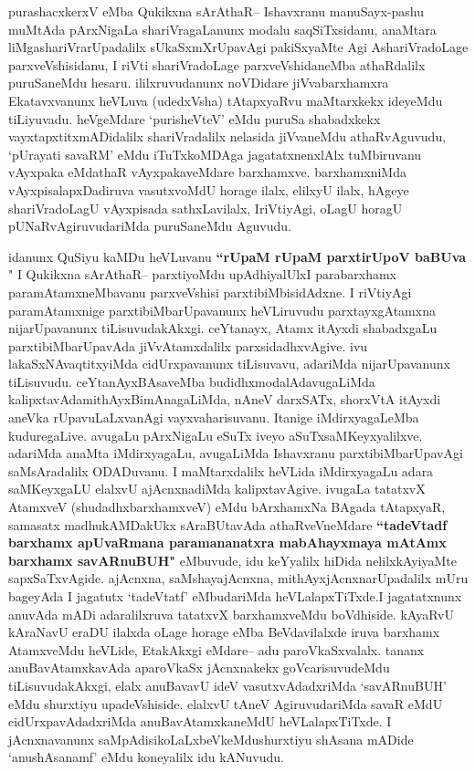 \begin{artha}
purashacxkerxV eMba Qukikxna sArAthaR-- Ishavxranu manuSayx-pashu muMtAda pArxNigaLa shariVragaLanunx modalu saqSiTxsidanu, anaMtara liMgashariVrarUpadalilx sUkaSxmXrUpavAgi pakiSxyaMte Agi AshariVradoLage parxveVshisidanu, I riVti shariVradoLage parxveVshidaneMba athaRdalilx puruSaneMdu hesaru. ililxruvudanunx noVDidare jiVvabarxhamxra Ekatavxvanunx heVLuva (udedxVsha) tAtapxyaRvu maMtarxkekx ideyeMdu tiLiyuvadu. heVgeMdare `purisheVteV' eMdu puruSa shabadxkekx vayxtapxtitxmADidalilx shariVradalilx nelasida jiVvaneMdu athaRvAguvudu, `pUrayati savaRM' eMdu iTuTxkoMDAga jagatatxnenxlAlx tuMbiruvanu vAyxpaka eMdathaR vAyxpakaveMdare barxhamxve. barxhamxniMda vAyxpisalapxDadiruva vasutxvoMdU horage ilalx, elilxyU ilalx, hAgeye shariVradoLagU vAyxpisada sathxLavilalx, IriVtiyAgi, oLagU horagU pUNaRvAgiruvudariMda puruSaneMdu Aguvudu.  

idanunx QuSiyu kaMDu heVLuvanu \ndash \textbf{``rUpaM rUpaM parxtirUpoV baBUva}  \mdash  \mdash  " I Qukikxna sArAthaR-- parxtiyoMdu upAdhiyalUlx\break I parabarxhamx paramAtamxneMbavanu parxveVshisi parxtibiMbisidAdxne. I riVtiyAgi paramAtamxnige parxtibiMbarUpavanunx heVLiruvudu parxtayxgAtamxna nijarUpavanunx tiLisuvudakAkxgi.  ceYtanayx, Atamx itAyxdi shabadxgaLu parxtibiMbarUpavAda jiVvAtamxdalilx parxsidadhxvAgive. ivu lakaSxNAvaqtitxyiMda cidUrxpavanunx tiLisuvavu, adariMda nijarUpavanunx tiLisuvudu. ceYtanAyxBAsaveMba budidhxmodalAdavugaLiMda kalipxtavAda\break mithAyxBimAnagaLiMda, nAneV darxSATx, shorxVtA itAyxdi aneVka rUpavuLaLxvanAgi vayxvaharisuvanu. Itanige iMdirxyagaLeMba kuduregaLive. avugaLu pArxNigaLu eSuTx iveyo aSuTxsaMKeyxyalilxve. adariMda anaMta iMdirxyagaLu, avugaLiMda Ishavxranu parxtibiMbarUpavAgi saMsAradalilx ODADuvanu. I maMtarxdalilx heVLida iMdirxyagaLu adara saMKeyxgaLU elalxvU ajAcnxnadiMda kalipxtavAgive. ivugaLa tatatxvX AtamxveV (shudadhxbarxhamxveV) eMdu bArxhamxNa BAgada tAtapxyaR, samasatx madhukAMDakUkx sAraBUtavAda athaRveVneMdare \textbf{``tadeVtadf barxhamx apUvaRmana paramananatxra mabAhayxmaya mAtAmx barxhamx savARnuBUH"} eMbuvude, idu keYyalilx hiDida nelilxkAyiyaMte sapxSaTxvAgide. ajAcnxna, saMshayajAcnxna, mithAyxjAcnxnarUpadalilx mUru bageyAda I jagatutx `tadeVtatf' eMbudariMda heVLalapxTiTxde.\break I jagatatxnunx anuvAda mADi adaralilxruva tatatxvX barxhamxveMdu boVdhiside. kAyaRvU kAraNavU eraDU ilalxda oLage horage eMba BeVdavilalxde iruva barxhamx AtamxveMdu heVLide, EtakAkxgi eMdare-- adu paroVkaSxvalalx. tananx anuBavAtamxkavAda aparoVkaSx jAcnxnakekx goVcarisuvudeMdu tiLisuvudakAkxgi, elalx anuBavavU ideV vasutxvAdadxriMda `savARnuBUH' eMdu shurxtiyu upadeVshiside. elalxvU tAneV AgiruvudariMda savaR eMdU cidUrxpavAdadxriMda anuBavAtamxkaneMdU heVLalapxTiTxde. I jAcnxnavanunx saMpAdisikoLaLxbeVkeMdu\break shurxtiyu shAsana mADide `anushAsanamf' eMdu koneyalilx idu kANuvudu.
\end{artha}

